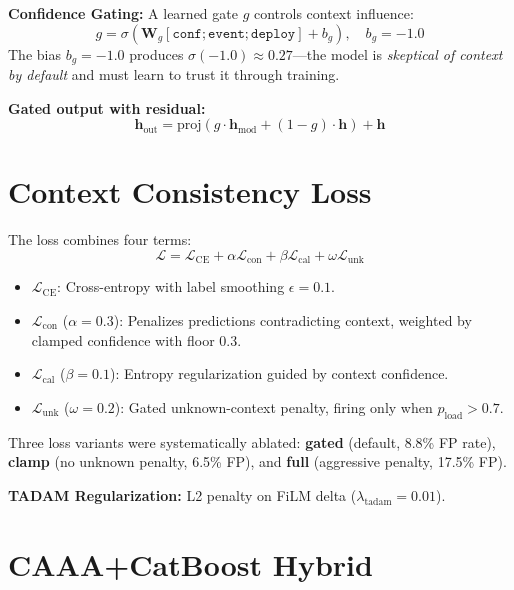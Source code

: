 \documentclass[12pt,a4paper]{report}
\begin{document}
\textbf{Confidence Gating:} A learned gate $g$ controls context influence:
\begin{equation}
    g = \sigma(\mathbf{W}_g [\texttt{conf}; \texttt{event}; \texttt{deploy}] + b_g), \quad b_g = -1.0
\end{equation}
The bias $b_g = -1.0$ produces $\sigma(-1.0) \approx 0.27$---the model is \textit{skeptical of context by default} and must learn to trust it through training.

\textbf{Gated output with residual:}
\begin{equation}
    \mathbf{h}_{\text{out}} = \text{proj}(g \cdot \mathbf{h}_{\text{mod}} + (1{-}g) \cdot \mathbf{h}) + \mathbf{h}
\end{equation}

\section{Context Consistency Loss}

The loss combines four terms:
\begin{equation}
    \mathcal{L} = \mathcal{L}_{\text{CE}} + \alpha \mathcal{L}_{\text{con}} + \beta \mathcal{L}_{\text{cal}} + \omega \mathcal{L}_{\text{unk}}
\end{equation}

\begin{itemize}
    \item $\mathcal{L}_{\text{CE}}$: Cross-entropy with label smoothing $\epsilon{=}0.1$.
    \item $\mathcal{L}_{\text{con}}$ ($\alpha{=}0.3$): Penalizes predictions contradicting context, weighted by clamped confidence with floor 0.3.
    \item $\mathcal{L}_{\text{cal}}$ ($\beta{=}0.1$): Entropy regularization guided by context confidence.
    \item $\mathcal{L}_{\text{unk}}$ ($\omega{=}0.2$): Gated unknown-context penalty, firing only when $p_{\text{load}} > 0.7$.
\end{itemize}

Three loss variants were systematically ablated: \textbf{gated} (default, 8.8\% FP rate), \textbf{clamp} (no unknown penalty, 6.5\% FP), and \textbf{full} (aggressive penalty, 17.5\% FP).

\textbf{TADAM Regularization:} L2 penalty on FiLM delta ($\lambda_{\text{tadam}} = 0.01$).

\section{CAAA+CatBoost Hybrid}
\end{document}
